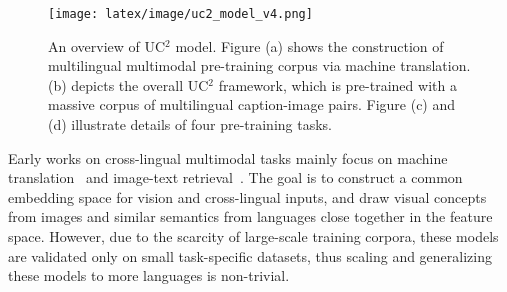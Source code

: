 \documentclass[final]{cvpr}
\newcommand{\jj}[1]{\textcolor{red}{\small{\bf [JJ: #1 ]}}}
\newcommand{\linjie}[1]{\textcolor{asparagus}{\small{\bf [Linjie: #1 ]}}}
\begin{document}
\begin{figure*}[h!]
\centering
\texttt{[image: latex/image/uc2\_model\_v4.png]}
\caption{An overview of UC$^2$ model. Figure (a) shows the construction of multilingual multimodal pre-training corpus via machine translation. 
(b) depicts the overall UC$^2$ framework, which is pre-trained with a massive corpus of multilingual caption-image pairs. 
Figure (c) and (d) illustrate details of four pre-training tasks.}

\label{fig:model}
\end{figure*}

Early works on cross-lingual multimodal tasks mainly focus on machine translation~\cite{hewitt2018learning,zhou2018visual,calixto-liu-2017-incorporating,yao-wan-2020-multimodal,DBLP:journals/corr/abs-1807-11605} and image-text retrieval~\cite{gella2017image,MULE,SMALR,Par.EMnb, S-LIWE}. The goal is to construct a common embedding space for vision and cross-lingual inputs, and draw visual concepts from images and similar semantics from languages close together in the feature space. %
However, due to the scarcity of large-scale training corpora, these models are validated only on small task-specific datasets, thus scaling and generalizing these models to more languages is non-trivial. 
\end{document}

